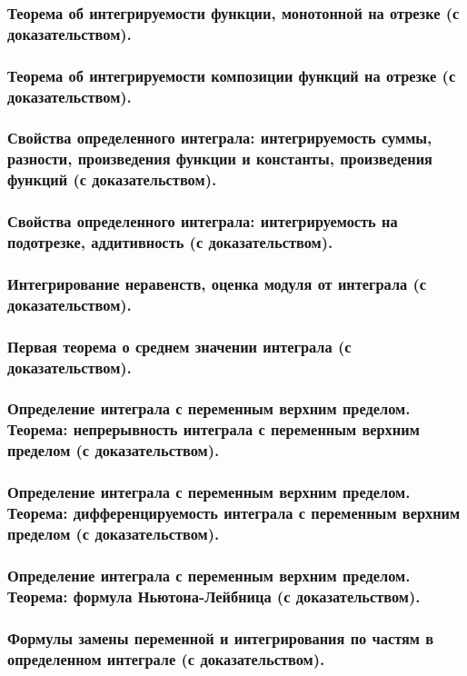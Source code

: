 \documentclass[10pt]{article}
\begin{document}
    \subsubsection{Теорема об интегрируемости функции, монотонной на отрезке (с доказательством).}
    \subsubsection{Теорема об интегрируемости композиции функций на отрезке (с доказательством).}
    \subsubsection{Свойства определенного интеграла: интегрируемость суммы, разности, произведения функции и константы, произведения функций (с доказательством).}
    \subsubsection{Свойства определенного интеграла: интегрируемость на подотрезке, аддитивность (с доказательством).}
    \subsubsection{Интегрирование неравенств, оценка модуля от интеграла (с доказательством).}
    \subsubsection{Первая теорема о среднем значении интеграла (с доказательством).}
    \subsubsection{Определение интеграла с переменным верхним пределом. Теорема: непрерывность интеграла с переменным верхним пределом (с доказательством).}
    \subsubsection{Определение интеграла с переменным верхним пределом. Теорема: дифференцируемость интеграла с переменным верхним пределом (с доказательством).}
    \subsubsection{Определение интеграла с переменным верхним пределом. Теорема: формула Ньютона-Лейбница (с доказательством).}
    \subsubsection{Формулы замены переменной и интегрирования по частям в определенном интеграле (с доказательством).}
\end{document}
